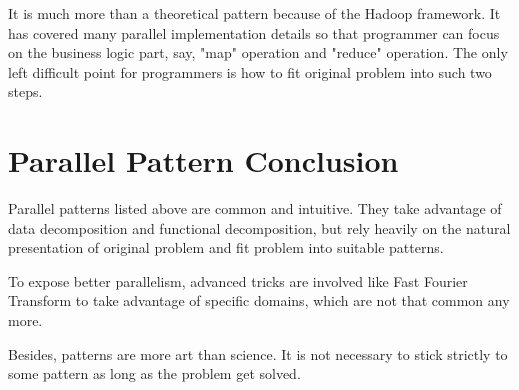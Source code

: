 It is much more than a theoretical pattern because of the Hadoop framework. It has covered many parallel implementation details so that programmer can focus on the business logic part, say, "map" operation and "reduce" operation. The only left difficult point for programmers is how to fit original problem into such two steps.

\section{Parallel Pattern Conclusion}

Parallel patterns listed above are common and intuitive. They take advantage of data decomposition and functional decomposition, but rely heavily on the natural presentation of original problem and fit problem into suitable patterns.

To expose better parallelism, advanced tricks are involved like Fast Fourier Transform to take advantage of specific domains, which are not that common any more.

Besides, patterns are more art than science. It is not necessary to stick strictly to some pattern as long as the problem get solved.
